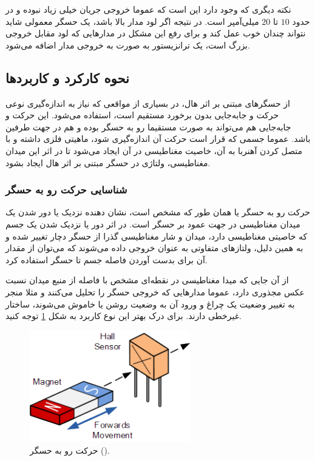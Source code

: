 \documentclass[conference]{IEEEtran-ModifiedForMVIP}
\begin{document}
نکته دیگری که وجود دارد این است که عموما خروجی جریان خیلی زیاد نبوده و در حدود $10$ تا $20$ میلی‌آمپر است. در نتیجه اگر لود مدار بالا باشد، یک حسگر معمولی شاید نتواند چندان خوب عمل کند و برای رفع این مشکل در مدار‌هایی که لود مقابل خروجی بزرگ است، یک ترانزیستور  به صورت  به خروجی مدار اضافه می‌شود. 	\cite{ele_hall_2013}


\subsection{نحوه کارکرد و کاربردها}

از حسگر‌های مبتنی بر اثر هال، در بسیاری از مواقعی که نیاز به اندازه‌گیری نوعی حرکت و جابه‌جایی بدون برخورد مستقیم است، استفاده می‌شود. این حرکت و جا‌به‌جایی هم می‌تواند به صورت مستقیما رو به حسگر بوده و هم در جهت طرفین باشد. عموما جسمی که قرار است حرکت‌ آن اندازه‌گیری شود، ماهیتی فلزی داشته و با متصل کردن آهنربا به آن، خاصیت مغناطیسی در آن ایجاد می‌شود تا در اثر این میدان مغناطیسی، ولتاژی در حسگر مبتنی بر اثر هال ایجاد بشود.

\subsubsection{شناسایی حرکت رو به حسگر}

حرکت رو به حسگر یا  همان طور که مشخص است، نشان دهنده نزدیک یا دور شدن یک میدان مغناطیسی در جهت عمود بر حسگر است. در اثر دور یا نزدیک شدن یک جسم که خاصیتی مغناطیسی دارد، میدان و شار مغناطیسی گذرا از حسگر دچار تغییر شده و به همین دلیل، ولتاز‌های متفاوتی به عنوان خروجی داده می‌شوند که می‌توان از مقدار آن برای بدست آوردن فاصله جسم تا حسگر استفاده کرد.

از آن جایی که میدا مغناطیسی در نقطه‌ای مشخص با فاصله از منبع میدان نسبت عکس مجذوری دارد، عموما مدارهایی که خروجی حسگر را تحلیل می‌کنند و مثلا منجر به تغییر وضعیت یک چراغ و ورود آن به وضعیت روشن یا خاموش می‌شوند، ساختار غیرخطی دارند. برای درک بهتر این نوع کاربرد به شکل
\ref{fig:4}
توجه کنید.


\begin{figure}[t]
	
	\centering 
	\includegraphics[width=70mm]{Images/4.pdf}
	\caption{حرکت رو به حسگر ().
		\cite{ele_hall_2013}	
	}\label{fig:4}
\end{figure}
\end{document}
